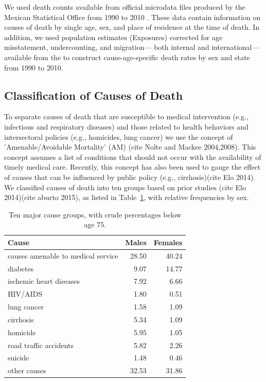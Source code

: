 \documentclass{article}
\begin{document}
We used death counts available from official microdata files produced by the
Mexican Statistical Office from 1990 to 2010 \citep{INEGI}. These data contain
information on causes of death by single age, sex, and place of residence at the
time of death. In addition, we used population estimates (Exposures) corrected
for age misstatement, undercounting, and migration--- both internal and
international--- available from the \citet{SOMEDE} to construct
cause-age-specific death rates by sex and state from 1990 to 2010.

\subsection*{Classification of Causes of Death}

To separate causes of death that are susceptible to medical intervention (e.g.,
infectious and respiratory diseases) and those related to health behaviors and
intersectoral policies (e.g., homicides, lung cancer) we use the concept of
'Amenable/Avoidable Mortality' (AM) (cite Nolte and Mackee 2004,2008). This
concept assumes a list of conditions that should not occur with the availability
of timely medical care. Recently, this concept has also been used to gauge the
effect of causes that can be influenced by public policy (e.g., cirrhosis)(cite
Elo 2014). We classified causes of death into ten groups based on prior studies
(cite Elo 2014)(cite aburto 2015), as listed in Table~\ref{tab:causes}, with
relative frequencies by sex.

\begin{table}[ht]
\centering
\caption{Ten major cause groups, with crude percentages below age 75.}
\label{tab:causes}
\begin{tabular}{>{\raggedright}m{3cm}rr}
 Cause & Males & Females \\ 
  \hline
causes amenable to medical service & 28.50 & 40.24 \\ 
  diabetes & 9.07 & 14.77 \\ 
  ischemic heart diseases & 7.92 & 6.66 \\ 
  HIV/AIDS & 1.80 & 0.51 \\ 
  lung cancer & 1.58 & 1.09 \\ 
  cirrhosis & 5.34 & 1.09 \\ 
  homicide & 5.95 & 1.05 \\ 
  road traffic accidents & 5.82 & 2.26 \\ 
  suicide & 1.48 & 0.46 \\ 
  other causes & 32.53 & 31.86 \\ 
   \hline
\end{tabular}
\end{table}
\end{document}
